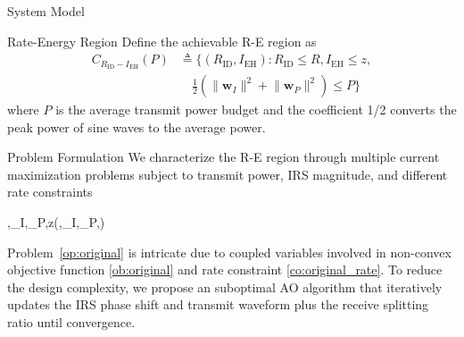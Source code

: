 \documentclass[journal]{IEEEtran}
\begin{document}
\begin{section}{System Model}
		\begin{subsection}{Rate-Energy Region}
			Define the achievable R-E region as
			\begin{align}
				C_{R_{\text{ID}}-I_{\text{EH}}}(P)
				&\triangleq \biggl\{(R_{\text{ID}}, I_{\text{EH}}): R_{\text{ID}} \le R, I_{\text{EH}} \le z,\nonumber\\
				&\quad \frac{1}{2}\left(\lVert{\boldsymbol{w}_I}\rVert^2+\lVert{\boldsymbol{w}_P}\rVert^2\right) \le P\biggr\}
			\end{align}
			where $P$ is the average transmit power budget and the coefficient \num{1/2} converts the peak power of sine waves to the average power.
		\end{subsection}
	\end{section}


	\begin{section}{Problem Formulation}\label{se:problem_formulation}
		We characterize the R-E region through multiple current maximization problems subject to transmit power, IRS magnitude, and different rate constraints
		\begin{maxi!}
			{\boldsymbol{\phi},\boldsymbol{w}_I,_P,\rho}{z(\boldsymbol{\phi},\boldsymbol{w}_I,_P,\rho)}{\label{op:original}}{\label{ob:original}}
			\label{co:original_power}
			\label{co:original_rate}
			\label{co:original_modulus}
		\end{maxi!}
		Problem~\ref{op:original} is intricate due to coupled variables involved in non-convex objective function \ref{ob:original} and rate constraint \ref{co:original_rate}. To reduce the design complexity, we propose an suboptimal AO algorithm that iteratively updates the IRS phase shift and transmit waveform plus the receive splitting ratio until convergence.



\end{section}
\end{document}
